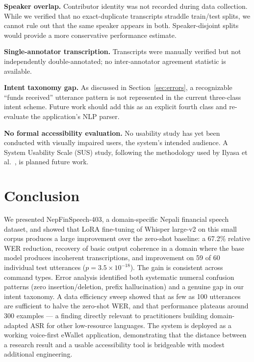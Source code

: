 \documentclass[11pt,a4paper]{article}
\begin{document}
\textbf{Speaker overlap.} Contributor identity was not recorded during data
collection. While we verified that no exact-duplicate transcripts straddle
train/test splits, we cannot rule out that the same speaker appears in both.
Speaker-disjoint splits would provide a more conservative performance
estimate.

\textbf{Single-annotator transcription.} Transcripts were manually
verified but not independently double-annotated; no inter-annotator
agreement statistic is available.

\textbf{Intent taxonomy gap.} As discussed in Section~\ref{sec:errors}, a
recognizable ``funds received'' utterance pattern is not represented in the
current three-class intent scheme. Future work should add this as an
explicit fourth class and re-evaluate the application's NLP parser.

\textbf{No formal accessibility evaluation.} No usability study has yet
been conducted with visually impaired users, the system's intended
audience. A System Usability Scale (SUS) study, following the methodology
used by Ilyasa et al.~\cite{ilyasa2023}, is planned future work.

\section{Conclusion}

We presented NepFinSpeech-403, a domain-specific Nepali financial
speech dataset, and showed that LoRA fine-tuning of Whisper large-v2 on
this small corpus produces a large improvement over
the zero-shot baseline: a 67.2\% relative WER reduction, recovery of basic
output coherence in a domain where the base model produces
incoherent transcriptions, and improvement on 59 of 60 individual test
utterances ($p = 3.5\times10^{-18}$). The gain is consistent across command
types. Error analysis identified both systematic numeral confusion
patterns (zero insertion/deletion, prefix hallucination) and a genuine gap
in our intent taxonomy. A data efficiency sweep showed that as few as
100 utterances are sufficient to halve the zero-shot WER, and that
performance plateaus around 300 examples --- a finding directly relevant
to practitioners building domain-adapted ASR for other low-resource
languages. The system is deployed as a working voice-first eWallet
application, demonstrating that the distance between a research result
and a usable accessibility tool is bridgeable with modest additional
engineering.
\end{document}
